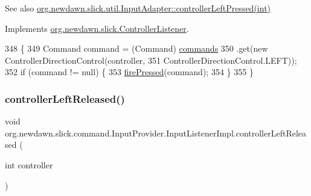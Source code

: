 \begin{DoxySeeAlso}{See also}
\mbox{\hyperlink{classorg_1_1newdawn_1_1slick_1_1util_1_1_input_adapter_ad588e2783005ae0ff252efbc282688cb}{org.\+newdawn.\+slick.\+util.\+Input\+Adapter\+::controller\+Left\+Pressed(int)}} 
\end{DoxySeeAlso}


Implements \mbox{\hyperlink{interfaceorg_1_1newdawn_1_1slick_1_1_controller_listener_abfb38c5d8e44b7613a49cbfaf19d5585}{org.\+newdawn.\+slick.\+Controller\+Listener}}.


\begin{DoxyCode}
348                                                           \{
349             Command command = (Command) \mbox{\hyperlink{classorg_1_1newdawn_1_1slick_1_1command_1_1_input_provider_ab2bd0c08506a59bc7457d7a87cf873d2}{commands}}
350                     .\textcolor{keyword}{get}(\textcolor{keyword}{new} ControllerDirectionControl(controller,
351                             ControllerDirectionControl.LEFT));
352             \textcolor{keywordflow}{if} (command != null) \{
353                 \mbox{\hyperlink{classorg_1_1newdawn_1_1slick_1_1command_1_1_input_provider_a82cd36086b5780ccce446717e8075e96}{firePressed}}(command);
354             \}
355         \}
\end{DoxyCode}
\mbox{\label{classorg_1_1newdawn_1_1slick_1_1command_1_1_input_provider_1_1_input_listener_impl_ae67daea3a1e5b57c6189099410b17521}} 
\subsubsection{\texorpdfstring{controller\+Left\+Released()}{controllerLeftReleased()}}
{\footnotesize\ttfamily void org.\+newdawn.\+slick.\+command.\+Input\+Provider.\+Input\+Listener\+Impl.\+controller\+Left\+Released (\begin{DoxyParamCaption}\item[{int}]{controller }\end{DoxyParamCaption})\hspace{0.3cm}{\ttfamily [inline]}}

